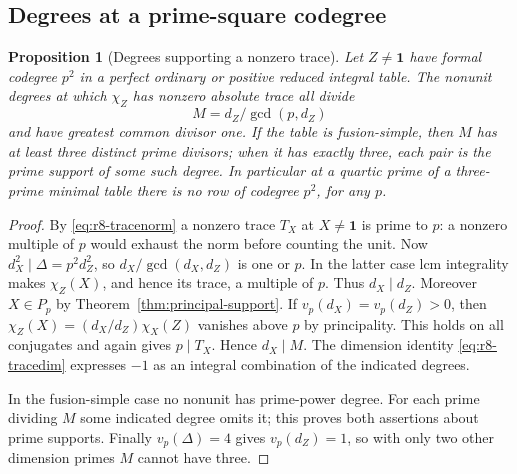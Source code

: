 \documentclass[11pt,a4paper]{article}
\numberwithin{equation}{section}
\newtheorem{proposition}[theorem]{Proposition}
\theoremstyle{remark}
\newcommand{\one}{\mathbf1}
\begin{document}
\subsection{Degrees at a prime-square codegree}\label{fam:M:sec:5.3}
\begin{proposition}[Degrees supporting a nonzero trace]\label{fam:M:5.7}
\label{prop:quartic-two-codegree4}\label{prop:quartic-prime-top-codegree}
\label{prop:quartic-five-codegree25}
Let $Z\ne\one$ have formal codegree $p^2$ in a perfect ordinary or
positive reduced integral table. The nonunit degrees at which
$\chi_Z$ has nonzero absolute trace all divide
\[
                         M=d_Z/\gcd(p,d_Z)
\]
and have greatest common divisor one.
If the table is fusion-simple, then $M$ has at least three distinct
prime divisors; when it has exactly three, each pair is the prime
support of some such degree. In particular at a quartic prime of a
three-prime minimal table there is no row of codegree $p^2$, for any $p$.
\end{proposition}
\begin{proof}
By \eqref{eq:r8-tracenorm} a nonzero trace $T_X$ at $X\ne\one$
is prime to $p$: a nonzero multiple of $p$ would exhaust the norm
before counting the unit. Now $d_X^2\mid\Delta=p^2d_Z^2$, so
$d_X/\gcd(d_X,d_Z)$ is one or $p$. In the latter case lcm
integrality makes $\chi_Z(X)$, and hence its trace, a multiple of
$p$. Thus $d_X\mid d_Z$. Moreover $X\in P_p$ by
Theorem~\ref{thm:principal-support}. If
$v_p(d_X)=v_p(d_Z)>0$, then
$\chi_Z(X)=(d_X/d_Z)\chi_X(Z)$ vanishes above $p$ by principality.
This holds on all conjugates and again gives $p\mid T_X$.
Hence $d_X\mid M$. The dimension identity \eqref{eq:r8-tracedim}
expresses $-1$ as an integral combination of the indicated degrees.

In the fusion-simple case no nonunit has prime-power degree. For
each prime dividing $M$ some indicated degree omits it; this proves
both assertions about prime supports. Finally $v_p(\Delta)=4$
gives $v_p(d_Z)=1$, so with only two other dimension primes $M$
cannot have three.
\end{proof}
\end{document}
